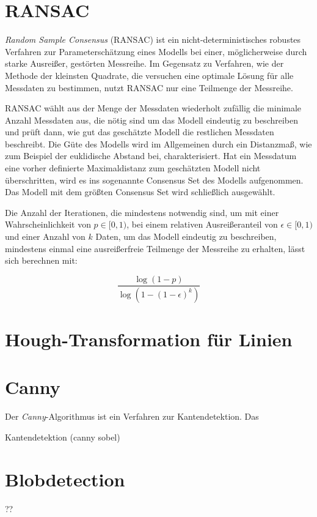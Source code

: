 \section{RANSAC}
\label{s:ransac}
\textit{Random Sample Consensus} (RANSAC) \cite{Fischler1981} ist ein nicht-deterministisches robustes Verfahren zur Parameterschätzung eines Modells bei einer, möglicherweise durch starke Ausreißer, gestörten Messreihe. 
Im Gegensatz zu Verfahren, wie der Methode der kleinsten Quadrate, die versuchen eine optimale Lösung für alle Messdaten zu bestimmen, nutzt RANSAC nur eine Teilmenge der Messreihe. 

RANSAC wählt aus der Menge der Messdaten wiederholt zufällig die minimale Anzahl Messdaten aus, die nötig sind um das Modell eindeutig zu beschreiben und prüft dann, wie gut das geschätzte Modell die restlichen Messdaten beschreibt. 
Die Güte des Modells wird im Allgemeinen durch ein Distanzmaß, wie zum Beispiel der euklidische Abstand bei, charakterisiert. 
Hat ein Messdatum eine vorher definierte Maximaldistanz zum geschätzten Modell nicht überschritten, wird es ins sogenannte Consensus Set des Modells aufgenommen. 
Das Modell mit dem größten Consensus Set wird schließlich ausgewählt. 

Die Anzahl der Iterationen, die mindestens notwendig sind, um mit einer Wahrscheinlichkeit von $p \in [0,1)$, bei einem relativen Ausreißeranteil von $\epsilon \in[0,1)$ und einer Anzahl von $k$ Daten, um das Modell eindeutig zu beschreiben, mindestens einmal eine ausreißerfreie Teilmenge der Messreihe zu erhalten,  lässt sich berechnen mit:

\begin{equation}
	\frac{\log{\left(1-p\right)}}{\log{\left(1-\left(1-\epsilon\right)^k\right)}}
\end{equation}




\section{Hough-Transformation für Linien}
\label{s:hough}




\section{Canny}
\label{s:canny}
Der \textit{Canny}-Algorithmus\cite{Canny1986} ist ein Verfahren zur Kantendetektion. Das 



Kantendetektion (canny sobel)

\section{Blobdetection}
\label{s:blob}
??
